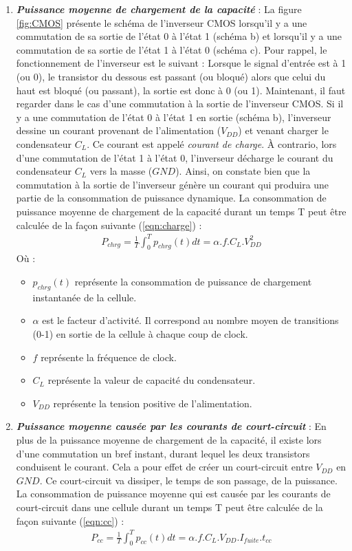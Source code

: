 \documentclass[oneside]{book}
\begin{document}
\begin{enumerate}
\vspace{-0.2 cm}\item \textbf{\textit{Puissance moyenne de chargement de la capacité}} : La figure \ref{fig:CMOS} présente le schéma de l'inverseur CMOS lorsqu'il y a une commutation de sa sortie de l'état 0 à l'état 1 (schéma b) et lorsqu'il y a une commutation de sa sortie de l'état 1 à l'état 0 (schéma c). Pour rappel, le fonctionnement de l'inverseur est le suivant : Lorsque le signal d'entrée est à 1 (ou 0), le transistor du dessous est passant (ou bloqué) alors que celui du haut est bloqué (ou passant), la sortie est donc à 0 (ou 1). Maintenant, il faut regarder dans le cas d'une commutation à la sortie de l'inverseur CMOS. Si il y a une commutation de l'état 0 à l'état 1 en sortie (schéma b), l'inverseur dessine un courant provenant de l'alimentation ($V_{DD}$) et venant charger le condensateur $C_L$. Ce courant est appelé \textit{courant de charge}. À contrario, lors d'une commutation de l'état 1 à l'état 0, l'inverseur décharge le courant du condensateur $C_L$ vers la masse ($GND$). Ainsi, on constate bien que la commutation à la sortie de l'inverseur génère un courant qui produira une partie de la consommation de puissance dynamique. La consommation de puissance moyenne de chargement de la capacité durant un temps T peut être calculée de la façon suivante (\ref{eqn:charge}) :
\begin{gather}
	P_{chrg} = \frac{1}{T}\int_{0}^{T}p_{chrg}(t)dt=\alpha.f.C_{L}.V_{DD}^{2}\label{eqn:charge}
\end{gather}
Où :
\begin{itemize}
\item $p_{chrg}(t)$ représente la consommation de puissance de chargement instantanée de la cellule.
\item $\alpha$ est le facteur d'activité. Il correspond au nombre moyen de transitions (0-1) en sortie de la cellule à chaque coup de clock.
\item $f$ représente la fréquence de clock.
\item $C_L$ représente la valeur de capacité du condensateur.
\item $V_{DD}$ représente la tension positive de l'alimentation. \\
\end{itemize}


\vspace{-0.2 cm}\item \textbf{\textit{Puissance moyenne causée par les courants de court-circuit}} : En plus de la puissance moyenne de chargement de la capacité, il existe lors d'une commutation un bref instant, durant lequel les deux transistors conduisent le courant. Cela a pour effet de créer un court-circuit entre $V_{DD}$ en $GND$. Ce court-circuit va dissiper, le temps de son passage, de la puissance. La consommation de puissance moyenne qui est causée par les courants de court-circuit dans une cellule durant un temps T peut être calculée de la façon suivante (\ref{eqn:cc}) :
\begin{gather}
	P_{cc} = \frac{1}{T}\int_{0}^{T}p_{cc}(t)dt=\alpha.f.C_{L}.V_{DD}.I_{fuite}.t_{cc}\label{eqn:cc}
\end{gather}


\end{enumerate}
\end{document}
